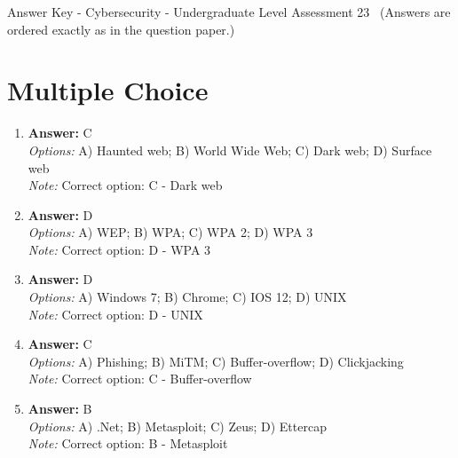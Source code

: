 \documentclass[12pt]{article}
\begin{document}
\begin{center}
Answer Key - Cybersecurity - Undergraduate Level Assessment 23 \
\small (Answers are ordered exactly as in the question paper.)
\end{center}

\section*{Multiple Choice}
\begin{enumerate}[label=\arabic*.]
\item \textbf{Answer:} C
\\ \textit{Options:} A) Haunted web; B) World Wide Web; C) Dark web; D) Surface web
\\ \textit{Note:} Correct option: C - Dark web
\item \textbf{Answer:} D
\\ \textit{Options:} A) WEP; B) WPA; C) WPA 2; D) WPA 3
\\ \textit{Note:} Correct option: D - WPA 3
\item \textbf{Answer:} D
\\ \textit{Options:} A) Windows 7; B) Chrome; C) IOS 12; D) UNIX
\\ \textit{Note:} Correct option: D - UNIX
\item \textbf{Answer:} C
\\ \textit{Options:} A) Phishing; B) MiTM; C) Buffer-overflow; D) Clickjacking
\\ \textit{Note:} Correct option: C - Buffer-overflow
\item \textbf{Answer:} B
\\ \textit{Options:} A) .Net; B) Metasploit; C) Zeus; D) Ettercap
\\ \textit{Note:} Correct option: B - Metasploit
\end{enumerate}
\end{document}
